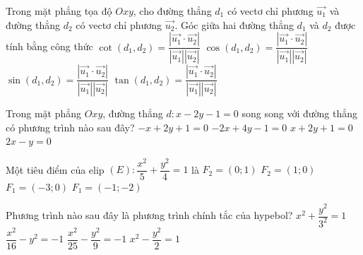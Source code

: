 \begin{ex}
	Trong mặt phẳng tọa độ $Oxy$, cho đường thẳng $d_1$ có vectơ chỉ phương $\vec{u_1}$ và đường thẳng $d_2$ có vectơ chỉ phương $\vec{u_2}$. Góc giữa hai đường thẳng $d_1$ và $d_2$ được tính bằng công thức
	\choice
	{$\cot (d_1,d_2)=\dfrac{|\vec{u_1}\cdot \vec{u_2}|}{|\vec{u_1}||\vec{u_2}|}$}
	{\True $\cos (d_1,d_2)=\dfrac{|\vec{u_1}\cdot \vec{u_2}|}{|\vec{u_1}||\vec{u_2}|}$}
	{$\sin (d_1,d_2)=\dfrac{|\vec{u_1}\cdot \vec{u_2}|}{|\vec{u_1}||\vec{u_2}|}$}
	{$\tan (d_1,d_2)=\dfrac{|\vec{u_1}\cdot \vec{u_2}|}{|\vec{u_1}||\vec{u_2}|}$}
\end{ex}

\begin{ex}%
	Trong mặt phẳng $Oxy$, đường thẳng $d\colon x-2y-1=0$ song song với đường thẳng có phương trình nào sau đây?
	\choice
	{$-x+2y+1=0$}
	{\True $-2x+4y-1=0$}
	{$x+2y+1=0$}
	{$2x-y=0$}
\end{ex}

\begin{ex}%
	Một tiêu điểm của elip $(E)\colon \dfrac{x^2}{5}+\dfrac{y^2}{4}=1$ là
	\choice
	{$F_2=(0;1)$}
	{\True $F_2=(1;0)$}
	{$F_1=(-3;0)$}
	{$F_1=(-1;-2)$}
\end{ex}

\begin{ex}%
	Phương trình nào sau đây là phương trình chính tắc của hypebol?
	\choice
	{$x^2+\dfrac{y^2}{3^2}=1$}
	{$\dfrac{x^2}{16}-y^2=-1$}
	{$\dfrac{x^2}{25}-\dfrac{y^2}{9}=-1$}
	{\True $x^2-\dfrac{y^2}{2}=1$}
\end{ex}

